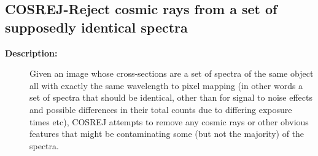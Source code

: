 \begin{description}
\subsection{COSREJ-\label{COSREJ}Reject cosmic rays from a set of supposedly identical spectra}
\begin{description}

\item [\textbf{Description:}]
 Given an image whose cross-sections are a set of spectra of the
 same object all with exactly the same wavelength to pixel mapping
 (in other words a set of spectra that should be identical, other
 than for signal to noise effects and possible differences in
 their total counts due to differing exposure times etc), COSREJ
 attempts to remove any cosmic rays or other obvious features that
 might be contaminating some (but not the majority) of the spectra.


\end{description}
\end{description}
